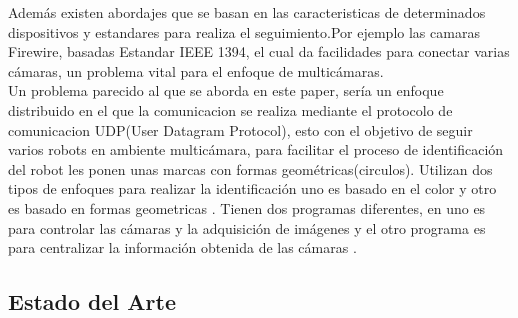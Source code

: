 \documentclass[conference]{IEEEtran}
\begin{document}
Adem\'as existen abordajes que se basan en las caracteristicas de determinados dispositivos y estandares para realiza el seguimiento.Por ejemplo las camaras Firewire, basadas Estandar IEEE 1394, el cual da facilidades para conectar varias c\'amaras, un problema vital para el enfoque de multic\'amaras\cite{kumar_mot}.\\
Un problema parecido al que se aborda en este paper, ser\'ia un enfoque distribuido en el que la comunicacion se realiza mediante el protocolo de comunicacion UDP(User Datagram Protocol), esto con el objetivo de seguir varios robots en ambiente multic\'amara, para facilitar el proceso de identificaci\'on del robot les ponen unas marcas con formas geom\'etricas(circulos). Utilizan dos tipos de enfoques para realizar la identificaci\'on uno es basado en el color y otro es basado en formas geometricas . Tienen dos programas diferentes, en uno es para controlar las c\'amaras y la adquisici\'on de im\'agenes y el otro programa es para centralizar la informaci\'on obtenida de las c\'amaras \cite{garcia_mot}. \\

\subsection{Estado del Arte}
 
\end{document}
